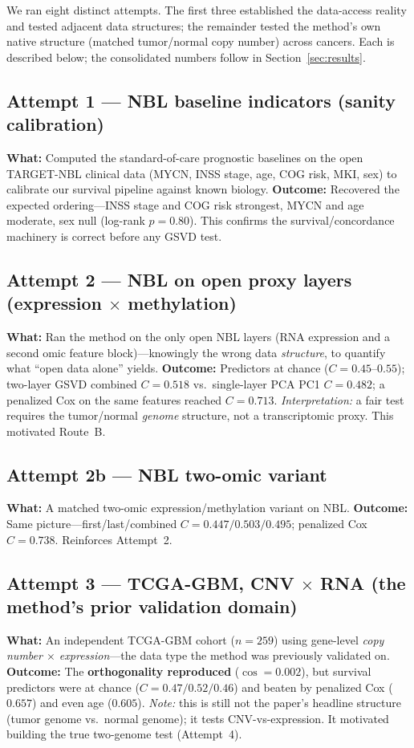 \documentclass[11pt]{article}
\begin{document}
We ran eight distinct attempts. The first three established the data-access
reality and tested adjacent data structures; the remainder tested the method's
own native structure (matched tumor/normal copy number) across cancers. Each is
described below; the consolidated numbers follow in Section~\ref{sec:results}.

\subsection*{Attempt 1 --- NBL baseline indicators (sanity calibration)}
\textbf{What:} Computed the standard-of-care prognostic baselines on the open
TARGET-NBL clinical data (MYCN, INSS stage, age, COG risk, MKI, sex) to
calibrate our survival pipeline against known biology.
\textbf{Outcome:} Recovered the expected ordering---INSS stage and COG risk
strongest, MYCN and age moderate, sex null (log-rank $p = 0.80$). This confirms
the survival/concordance machinery is correct before any GSVD test.

\subsection*{Attempt 2 --- NBL on open proxy layers (expression $\times$ methylation)}
\textbf{What:} Ran the method on the only open NBL layers (RNA expression and a
second omic feature block)---knowingly the wrong data \emph{structure}, to
quantify what ``open data alone'' yields.
\textbf{Outcome:} Predictors at chance ($C = 0.45$--$0.55$); two-layer GSVD
combined $C = 0.518$ vs.\ single-layer PCA PC1 $C = 0.482$; a penalized Cox on
the same features reached $C = 0.713$. \emph{Interpretation:} a fair test
requires the tumor/normal \emph{genome} structure, not a transcriptomic proxy.
This motivated Route~B.

\subsection*{Attempt 2b --- NBL two-omic variant}
\textbf{What:} A matched two-omic expression/methylation variant on NBL.
\textbf{Outcome:} Same picture---first/last/combined $C = 0.447 / 0.503 /
0.495$; penalized Cox $C = 0.738$. Reinforces Attempt~2.

\subsection*{Attempt 3 --- TCGA-GBM, CNV $\times$ RNA (the method's prior validation domain)}
\textbf{What:} An independent TCGA-GBM cohort ($n = 259$) using gene-level
\emph{copy number $\times$ expression}---the data type the method was previously
validated on.
\textbf{Outcome:} The \textbf{orthogonality reproduced} ($\cos = 0.002$), but
survival predictors were at chance ($C = 0.47 / 0.52 / 0.46$) and beaten by
penalized Cox ($0.657$) and even age ($0.605$). \emph{Note:} this is still not
the paper's headline structure (tumor genome vs.\ normal genome); it tests
CNV-vs-expression. It motivated building the true two-genome test (Attempt~4).
\end{document}
